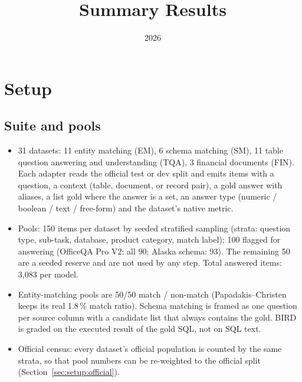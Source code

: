 \documentclass[11pt]{article}
\title{Summary Results}
\author{}
\date{2026}
\begin{document}
\maketitle

\section{Setup}
\label{sec:setup}

\subsection{Suite and pools}
\begin{itemize}
\item 31 datasets: 11 entity matching (EM), 6 schema matching (SM), 11 table question answering and understanding (TQA), 3 financial documents (FIN). Each adapter reads the official test or dev split and emits items with a question, a context (table, document, or record pair), a gold answer with aliases, a list gold where the answer is a set, an answer type (numeric / boolean / text / free-form) and the dataset's native metric.
\item Pools: 150 items per dataset by seeded stratified sampling (strata: question type, sub-task, database, product category, match label); 100 flagged for answering (OfficeQA Pro V2: all 90; Alaska schema: 93). The remaining 50 are a seeded reserve and are not used by any step. Total answered items: 3,083 per model.
\item Entity-matching pools are 50/50 match / non-match (Papadakis--Christen keeps its real 1.8\,\% match ratio). Schema matching is framed as one question per source column with a candidate list that always contains the gold. BIRD is graded on the executed result of the gold SQL, not on SQL text.
\item Official census: every dataset's official population is counted by the same strata, so that pool numbers can be re-weighted to the official split (Section~\ref{sec:setup:official}).
\end{itemize}
\end{document}
